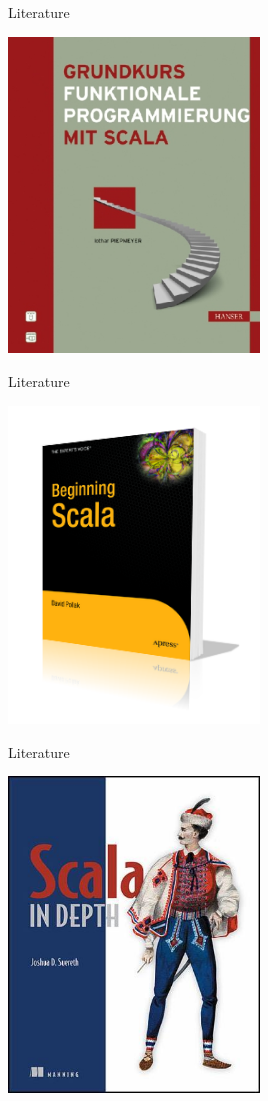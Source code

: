 \begin{frame}{Literature}
\begin{center}
\includegraphics[width=0.5\textwidth]{resources/GrundkursScala.jpg}
\end{center}
\end{frame}

\begin{frame}{Literature}
\begin{center}
\includegraphics[width=0.5\textwidth]{resources/BeginningScala.png}
\end{center}
\end{frame}

\begin{frame}{Literature}
\begin{center}
\includegraphics[width=0.5\textwidth]{resources/ScalaInDepth.jpg}
\end{center}
\end{frame}

